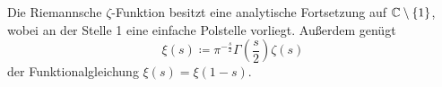\begin{frame}
    \begin{theorem}
        Die Riemannsche $\zeta$-Funktion besitzt eine analytische Fortsetzung auf $\mathbb{C}\setminus\{1\}$, wobei an der Stelle 1 eine einfache Polstelle vorliegt. Außerdem genügt 
        \[\xi(s) \coloneqq \pi^{-\frac{s}{2}} \Gamma\left(\frac{s}{2}\right)\zeta(s)\] der Funktionalgleichung $\xi(s) = \xi(1-s)$.
    \end{theorem}
\end{frame}